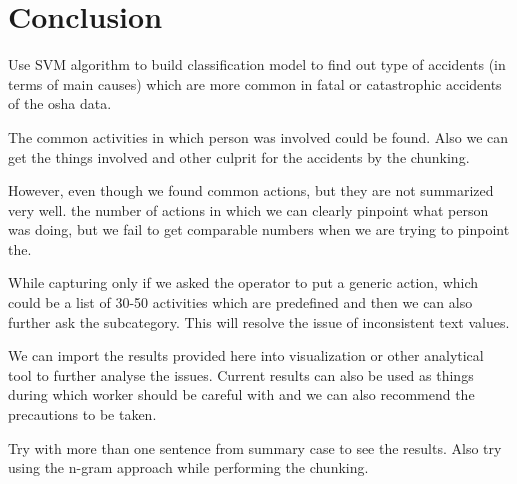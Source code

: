 \documentclass[DIV=calc, paper=a4, fontsize=11pt, twocolumn]{scrartcl}	 %
\begin{document}
\section{Conclusion}

Use SVM algorithm to build classification model to find out type of
accidents (in terms of main causes) which are more common in fatal or
catastrophic accidents of the osha data.

The common activities in which person was involved could be found.
Also we can get the things involved and other culprit for the
accidents by the chunking.

However, even though we found common actions, but they are not summarized very well.
the number of actions in which we can clearly pinpoint what person was
doing, but we fail to get comparable numbers when we are trying to
pinpoint the.

While capturing only if we asked the operator to put a generic action,
which could be a list of 30-50 activities which are predefined and
then we can also further ask the subcategory. This will resolve the
issue of inconsistent text values.

We can import the results provided here into visualization or other analytical tool to further analyse the issues.
Current results can also be used as things during which worker should
be careful with and we can also recommend the precautions to be taken.

Try with more than one sentence from summary case to see the results.
Also try using the n-gram approach while performing the chunking.



{}

\end{document}
